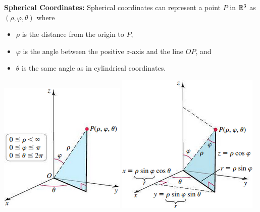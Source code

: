 \documentclass[../mathNotesPreamble]{subfiles}
\begin{document}
  \textbf{Spherical Coordinates:}\newline
  Spherical coordinates can represent a point $P$ in $\mathbb{R}^3$ as $(\rho, \varphi, \theta)$ where
  \begin{itemize}
    \item $\rho$ is the distance from the origin to $P$,
    \item $\varphi$ is the angle between the positive $z$-axis and the line $OP$, and
    \item $\theta$ is the same angle as in cylindrical coordinates.
  \end{itemize}
  \begin{center}
    \includegraphics[width=0.4\linewidth]{../images/briggs_16_05/fig16_55}
    \hspace*{25pt}
    \includegraphics[width=0.4\linewidth]{../images/briggs_16_05/fig16_56}
  \end{center}
\end{document}
